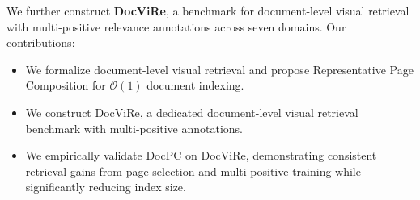 We further construct \textbf{DocViRe}, a benchmark for document-level visual retrieval with multi-positive relevance annotations across seven domains. Our contributions:
\begin{itemize}
    \item We formalize document-level visual retrieval and propose Representative Page Composition for $\mathcal{O}(1)$ document indexing.
    \item We construct DocViRe, a dedicated document-level visual retrieval  benchmark with multi-positive annotations.
    \item We empirically validate DocPC on DocViRe, demonstrating consistent retrieval gains from page selection and multi-positive training while significantly reducing index size.
\end{itemize}
